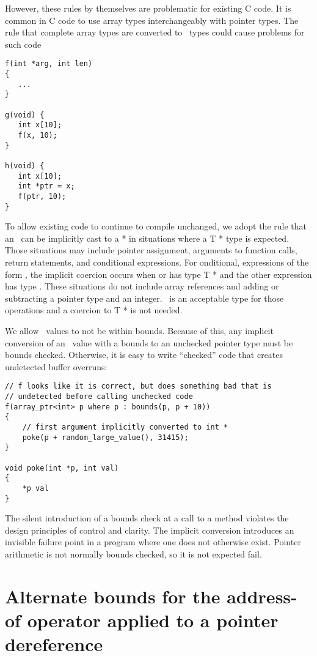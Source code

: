 However, these rules by themselves are problematic for existing C code.
It is common in C code to use array types interchangeably with pointer
types. The rule that complete array types are converted to
\arrayptr\ types could cause problems for such code

\begin{lstlisting}
f(int *arg, int len)
{ 
   ...
}

g(void) {
   int x[10];
   f(x, 10);
}

h(void) {
   int x[10];
   int *ptr = x;
   f(ptr, 10);
}
\end{lstlisting}

To allow existing code to continue to compile unchanged, we adopt the
rule that an \arrayptrT\ can be
implicitly cast to a  * in situations where a T * type is
expected. Those situations may include pointer assignment, arguments to
function calls, return statements, and conditional expressions. For
onditional, expressions of the form    \code{:}
, the implicit coercion occurs when  or  has type T * and
the other expression has type
\arrayptrT. These situations do not
include array references and adding or subtracting a pointer type and an
integer. \arrayptrT\ is an acceptable
type for those operations and a coercion to T * is not needed.

We allow \arrayptr\ values to not be within bounds. Because of
this, any implicit conversion of an \arrayptr\ value with a
bounds to an unchecked pointer type must be bounds checked. Otherwise, it
is easy to write ``checked'' code that creates undetected buffer overruns:

\begin{lstlisting}
// f looks like it is correct, but does something bad that is
// undetected before calling unchecked code
f(array_ptr<int> p where p : bounds(p, p + 10))
{
    // first argument implicitly converted to int *
    poke(p + random_large_value(), 31415);  
}

void poke(int *p, int val)
{
    *p val
}
\end{lstlisting}

The silent introduction of a bounds check at a call to a method violates
the design principles of control and clarity. The implicit conversion
introduces an invisible failure point in a program where one does not
otherwise exist. Pointer arithmetic is not normally bounds checked, so
it is not expected fail.

\section{Alternate bounds for the address-of operator applied to a pointer dereference}
\label{section:alternate-address-of-pointer-bounds}

